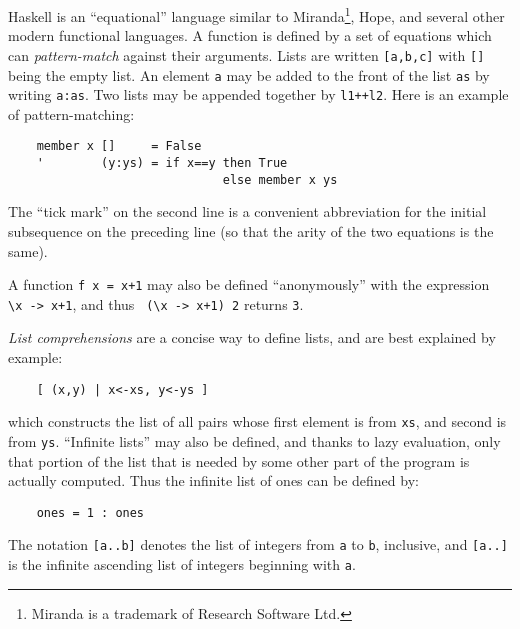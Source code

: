 Haskell is an ``equational'' language similar to
Miranda\footnote{Miranda is a trademark of Research Software Ltd.},
Hope, and several other modern functional languages.  A function is
defined by a set of equations which can {\em pattern-match} against
their arguments.  Lists are written {\tt [a,b,c]} with {\tt []} being
the empty list.  An element {\tt a} may be added to the front of the
list {\tt as} by writing {\tt a:as}.  Two lists may be appended
together by {\tt l1++l2}.  Here is an example of pattern-matching:
\begin{verbatim}
    member x []     = False
    '        (y:ys) = if x==y then True
                              else member x ys
\end{verbatim}
The ``tick mark'' on the second line is a convenient abbreviation for
the initial subsequence on the preceding line (so that the arity of
the two equations is the same).

A function {\tt f x = x+1} may also be defined ``anonymously'' with
the expression \verb! \x -> x+1!, and thus \verb! (\x -> x+1) 2!
returns {\tt 3}.

{\em List comprehensions} are a concise way to define lists, and are
best explained by example:
\begin{verbatim}
    [ (x,y) | x<-xs, y<-ys ]
\end{verbatim}
which constructs the list of all pairs whose first element is from
{\tt xs}, and second is from {\tt ys}.  ``Infinite lists'' may also be
defined, and thanks to lazy evaluation, only that portion of the list
that is needed by some other part of the program is actually computed.
Thus the infinite list of ones can be defined by:
\begin{verbatim}
    ones = 1 : ones
\end{verbatim}
The notation {\tt [a..b]} denotes the list of integers from {\tt a} to
{\tt b}, inclusive, and {\tt [a..]} is the infinite ascending list of
integers beginning with {\tt a}.

